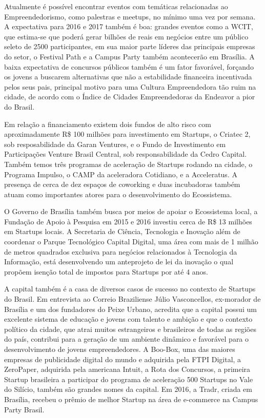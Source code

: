 Atualmente é possível encontrar eventos com temáticas relacionadas ao Empreendedorismo, como palestras e meetups, no mínimo uma vez por semana. A expectativa para 2016 e 2017 também é boa: grandes eventos como a WCIT, que estima-se que poderá gerar bilhões de reais em negócios entre um público seleto de 2500 participantes, em sua maior parte líderes das principais empresas do setor, o Festival Path e a Campus Party também acontecerão em Brasília. A baixa expectativa de concursos públicos também é um fator favorável, forçando os jovens a buscarem alternativas que não a estabilidade financeira incentivada pelos seus pais, principal motivo para uma Cultura Empreendedora tão ruim na cidade, de acordo com o Índice de Cidades Empreendedoras da Endeavor a pior do Brasil.

Em relação a financiamento existem dois fundos de alto risco com aproximadamente R\$ 100 milhões para investimento em Startups, o Criatec 2, sob resposabilidade da Garan Ventures, e o Fundo de Investimento em Participações Venture Brasil Central, sob responsabilidade da Cedro Capital. Também temos três programas de aceleração de Startups rodando na cidade, o Programa Impulso, o CAMP da aceleradora Cotidiano, e a Acceleratus. A presença de cerca de dez espaços de coworking e duas incubadoras também atuam como importantes atores para o desenvolvimento do Ecossistema.

O Governo de Brasília também busca por meios de apoiar o Ecossistema local, a Fundação de Apoio à Pesquisa em 2015 e 2016 investiu cerca de R\$ 13 milhões em Startups locais. A Secretaria de Ciência, Tecnologia e Inovação além de coordenar o Parque Tecnológico Capital Digital, uma área com mais de 1 milhão de metros quadrados exclusiva para negócios relacionados à Tecnologia da Informação, está desenvolvendo um anteprojeto de lei da inovação o qual propõem isenção total de impostos para Startups por até 4 anos. 

A capital também é a casa de diversos casos de sucesso no contexto de Startups do Brasil. Em entrevista ao Correio Braziliense Júlio Vasconcellos, ex-morador de Brasília e um dos fundadores do Peixe Urbano, acredita que a capital possui um excelente sistema de educação e jovens com talento e ambição e que o contexto político da cidade, que atrai muitos estrangeiros e brasileiros de todas as regiões do país, contribui para a geração de um ambiente dinâmico e favorável para o desenvolvimento de jovens empreendedores. A Boo-Box, uma das maiores empresas de publicidade digital do mundo e adquirida pela FTPI Digital, a ZeroPaper, adquirida pela americana Intuit, a Rota dos Concursos, a primeira Startup brasileira a participar do programa de aceleração 500 Startups no Vale do Silício, também são grandes nomes da capital. Em 2016, a Tradr, criada em Brasília, recebeu o prêmio de melhor Startup na área de e-commerce na Campus Party Brasil.

